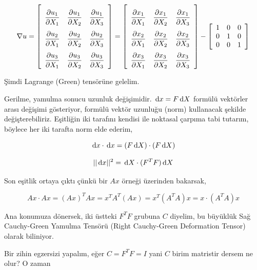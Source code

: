 \documentclass[12pt,fleqn]{article}\usepackage{../../common}
\begin{document}
$$
\renewcommand*{\arraystretch}{2.5}
\nabla u =
\left[\begin{array}{ccc}
\dfrac{\partial u_1}{\partial X_1} & \dfrac{\partial u_1}{\partial X_2} & \dfrac{\partial u_1}{\partial X_3} \\
\dfrac{\partial u_2}{\partial X_1} & \dfrac{\partial u_2}{\partial X_2} & \dfrac{\partial u_2}{\partial X_3} \\
\dfrac{\partial u_3}{\partial X_1} & \dfrac{\partial u_3}{\partial X_2} & \dfrac{\partial u_3}{\partial X_3} 
\end{array}\right] = 
\left[\begin{array}{ccc}
\dfrac{\partial x_1}{\partial X_1} & \dfrac{\partial x_1}{\partial X_2} & \dfrac{\partial x_1}{\partial X_3} \\
\dfrac{\partial x_2}{\partial X_1} & \dfrac{\partial x_2}{\partial X_2} & \dfrac{\partial x_2}{\partial X_3} \\
\dfrac{\partial x_3}{\partial X_1} & \dfrac{\partial x_3}{\partial X_2} & \dfrac{\partial x_3}{\partial X_3} 
\end{array}\right] -
\renewcommand*{\arraystretch}{1.0}
\left[\begin{array}{ccc}
1 & 0 & 0 \\ 0 & 1 & 0 \\ 0 & 0 & 1
\end{array}\right]
$$





Şimdi Lagrange (Green) tensörüne gelelim.

Gerilme, yamulma sonucu uzunluk değişimidir. $\,\mathrm{d} x = F \,\mathrm{d} X$ formülü vektörler
arası değişimi gösteriyor, formülü vektör uzunluğu (norm) kullanacak şekilde
değişterebiliriz. Eşitliğin iki tarafını kendisi ile noktasal çarpıma tabi
tutarım, böylece her iki tarafta norm elde ederim,

$$
\,\mathrm{d} x \cdot \,\mathrm{d} x  = (F \,\mathrm{d} X) \cdot (F \,\mathrm{d} X)
$$

$$
||\,\mathrm{d} x||^2  = \,\mathrm{d} X \cdot (F^T F) \,\mathrm{d} X
$$

Son eşitlik ortaya çıktı çünkü bir $Ax$ örneği üzerinden bakarsak,

$$
Ax \cdot Ax = (Ax)^T Ax = x^T A^T (Ax) = x^T (A^T A) x  = x \cdot (A^T A) x
$$

Ana konumuza dönersek, iki üstteki $F^T F$ grubuna $C$ diyelim, bu büyüklük
Sağ Cauchy-Green Yamulma Tensörü (Right Cauchy-Green Deformation Tensor)
olarak biliniyor.

Bir zihin egzersizi yapalım, eğer $C = F^T F = I$ yani $C$ birim matristir
dersem ne olur? O zaman
\end{document}
